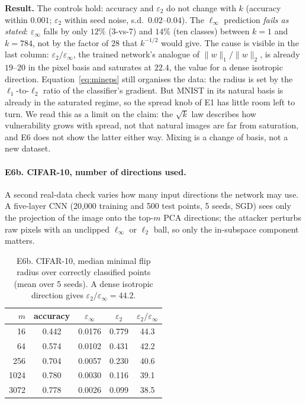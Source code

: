 \documentclass[11pt]{article}
\newcommand{\linf}{\ell_\infty}
\newcommand{\ltwo}{\ell_2}
\newcommand{\epsinf}{\varepsilon_\infty}
\newcommand{\epstwo}{\varepsilon_2}
\begin{document}
\textbf{Result.} The controls hold: accuracy and $\epstwo$ do not change with $k$
(accuracy within $0.001$; $\epstwo$ within seed noise, s.d.\ $0.02$--$0.04$). The
$\linf$ prediction \emph{fails as stated}: $\epsinf$ falls by only $12\%$
(3-vs-7) and $14\%$ (ten classes) between $k{=}1$ and $k{=}784$, not by the factor of
$28$ that $k^{-1/2}$ would give. The cause is visible in the last column: $\epstwo/\epsinf$,
the trained network's analogue of $\|w\|_1/\|w\|_2$, is already $19$--$20$ in the pixel
basis and saturates at $22.4$, the value for a dense isotropic direction. Equation~\eqref{eq:mineps}
still organises the data: the radius is set by the $\ell_1$-to-$\ell_2$ ratio of the
classifier's gradient. But MNIST in its natural basis is already in the saturated regime, so
the spread knob of E1 has little room left to turn. We read this as a limit
on the claim: the $\sqrt k$ law describes how vulnerability grows with
spread, not that natural images are far from saturation, and E6 does not show the
latter either way. Mixing is a change of basis, not a new dataset.

\paragraph{E6b. CIFAR-10, number of directions used.} A second real-data check
varies how many input directions the network may use. A five-layer CNN (20{,}000
training and 500 test points, 5 seeds, SGD) sees only the projection of the
image onto the top-$m$ PCA directions; the attacker perturbs raw pixels with an
unclipped $\linf$ or $\ltwo$ ball, so only the in-subspace component matters.

\begin{table}[h]
\centering
\caption{E6b. CIFAR-10, median minimal flip radius over correctly classified points
(mean over 5 seeds). A dense isotropic direction gives $\epstwo/\epsinf=44.2$.}
\label{tab:cifar}
\begin{tabular}{rcccc}
\toprule
$m$ & accuracy & $\epsinf$ & $\epstwo$ & $\epstwo/\epsinf$\\
\midrule
16   & 0.442 & 0.0176 & 0.779 & 44.3\\
64   & 0.574 & 0.0102 & 0.431 & 42.2\\
256  & 0.704 & 0.0057 & 0.230 & 40.6\\
1024 & 0.780 & 0.0030 & 0.116 & 39.1\\
3072 & 0.778 & 0.0026 & 0.099 & 38.5\\
\bottomrule
\end{tabular}
\end{table}
\end{document}
